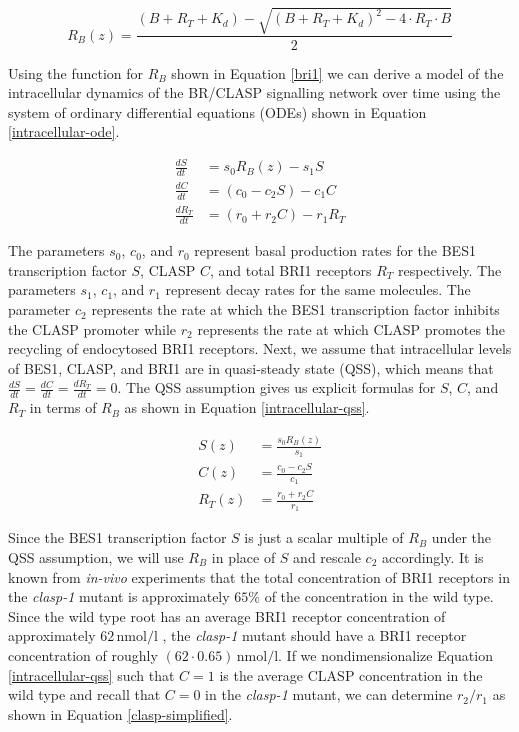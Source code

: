 \documentclass[referee,pdflatex,sn-mathphys-num]{sn-jnl}
\newcommand{\nm}{\,\unit{\nano\mole\per\litre}}
\begin{document}
\begin{appendices}
\begin{equation}
\label{bri1}
R_{B}(z) = \frac{(B + R_{T} + K_{d}) - \sqrt{(B + R_{T} + K_{d})^{2} - 4 \cdot  R_{T} \cdot B}}{2}
\end{equation}

Using the function for $R_{B}$ shown in Equation \ref{bri1} we can derive a model of the intracellular dynamics of the BR/CLASP signalling network over time using the system of ordinary differential equations (ODEs) shown in Equation \ref{intracellular-ode}.

\begin{equation}
\label{intracellular-ode}
\begin{aligned}
  \frac{ dS }{ dt } &= s_{0}R_{B}(z) - s_{1} S \\[5pt]
  \frac{ dC }{ dt } &= (c_{0} - c_{2}S) - c_{1}C \\[5pt]
  \frac{ dR_{T} }{ dt } &= (r_{0}  + r_{2}C) - r_{1}R_{T}
\end{aligned}
\end{equation}

The parameters $s_{0}$, $c_{0}$, and $r_{0}$ represent basal production rates for the BES1 transcription factor $S$, CLASP $C$, and total BRI1 receptors $R_{T}$ respectively.
The parameters $s_{1}$, $c_{1}$, and $r_{1}$ represent decay rates for the same molecules.
The parameter $c_{2}$ represents the rate at which the BES1 transcription factor inhibits the CLASP promoter while $r_{2}$ represents the rate at which CLASP promotes the recycling of endocytosed BRI1 receptors.
Next, we assume that intracellular levels of BES1, CLASP, and BRI1 are in quasi-steady state (QSS), which means that $\frac{dS}{dt} = \frac{dC}{dt} = \frac{dR_{T}}{dt} = 0$.
The QSS assumption gives us explicit formulas for $S$, $C$, and $R_{T}$ in terms of $R_{B}$ as shown in Equation \ref{intracellular-qss}. 

\begin{equation}
\label{intracellular-qss}
\begin{aligned}
  S(z) &= \frac{ s_{0} R_{B}(z)}{ s_{1} } \\[5pt]
  C(z) &= \frac{ c_{0} - c_{2}S }{ c_{1} } \\[5pt]
  R_{T}(z) &=\frac{ r_{0} + r_{2}C }{r_{1} } 
\end{aligned}
\end{equation}

Since the BES1 transcription factor $S$ is just a scalar multiple of $R_{B}$ under the QSS assumption, we will use $R_{B}$ in place of $S$ and rescale $c_{2}$ accordingly.
It is known from \emph{in-vivo} experiments \cite{ruan2018} that the total concentration of BRI1 receptors in the \emph{clasp-1} mutant is approximately $65\%$ of the concentration in the wild type.
Since the wild type root has an average BRI1 receptor concentration of approximately $62\nm$ \cite{vanesse2012}, the \emph{clasp-1} mutant should have a BRI1 receptor concentration of roughly $(62 \cdot 0.65)\nm$.
If we nondimensionalize Equation \ref{intracellular-qss} such that $C = 1$ is the average CLASP concentration in the wild type and recall that $C = 0$ in the \emph{clasp-1} mutant, we can determine $r_{2} / r_{1}$ as shown in Equation \ref{clasp-simplified}.


\end{appendices}
\end{document}
